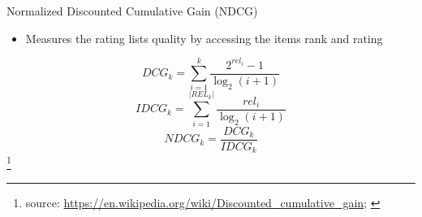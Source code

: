\documentclass[en]{sdqbeamer}
\newcommand\blfootnote[1]{%
  \begingroup
  \renewcommand\thefootnote{}\footnote{#1}%
  \addtocounter{footnote}{-1}%
  \endgroup
}
\begin{document}
\begin{frame}{Normalized Discounted Cumulative Gain (NDCG)}
	\begin{itemize}
		\item Measures the rating lists quality by accessing the items rank and rating
	\end{itemize}
	$$DCG_k = \sum_{i=1}^{k}\frac{2^{rel_i} - 1}{\log_2(i+1)}$$
	$$IDCG_k = \sum_{i=1}^{|REL_k|}\frac{rel_i}{\log_2(i+1)}$$
	$$NDCG_k = \frac{DCG_k}{IDCG_k}$$
	\blfootnote{source: \href{https://en.wikipedia.org/wiki/Discounted\_cumulative\_gain}{https://en.wikipedia.org/wiki/Discounted\_cumulative\_gain}; \cite{channarongHybridBERT4RecHybridContentBased2022}}
	
\end{frame}
\backupend


\end{document}
